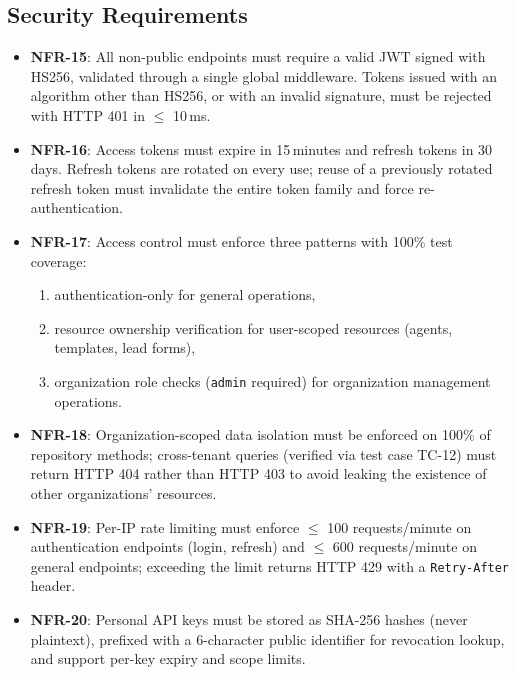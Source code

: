 \documentclass[a4paper]{article}
\begin{document}
\subsection{Security Requirements}
\label{sec:nfr-security}
\begin{itemize}
    \item \textbf{NFR-15}: All non-public endpoints must require
    a valid JWT signed with HS256, validated through a single
    global middleware. Tokens issued with an algorithm other than
    HS256, or with an invalid signature, must be rejected with
    HTTP 401 in $\leq$ 10\,ms.
    \item \textbf{NFR-16}: Access tokens must expire in 15\,minutes
    and refresh tokens in 30\,days. Refresh tokens are rotated on
    every use; reuse of a previously rotated refresh token must
    invalidate the entire token family and force re-authentication.
    \item \textbf{NFR-17}: Access control must enforce three
    patterns with 100\% test coverage:
    \begin{enumerate}
        \item[(a)] authentication-only for general operations,
        \item[(b)] resource ownership verification for user-scoped
        resources (agents, templates, lead forms),
        \item[(c)] organization role checks (\texttt{admin}
        required) for organization management operations.
    \end{enumerate}
    \item \textbf{NFR-18}: Organization-scoped data isolation
    must be enforced on 100\% of repository methods; cross-tenant
    queries (verified via test case TC-12) must return HTTP 404
    rather than HTTP 403 to avoid leaking the existence of other
    organizations' resources.
    \item \textbf{NFR-19}: Per-IP rate limiting must enforce
    $\leq$ 100 requests/minute on authentication endpoints (login,
    refresh) and $\leq$ 600 requests/minute on general endpoints;
    exceeding the limit returns HTTP 429 with a
    \texttt{Retry-After} header.
    \item \textbf{NFR-20}: Personal API keys must be stored as
    SHA-256 hashes (never plaintext), prefixed with a 6-character
    public identifier for revocation lookup, and support
    per-key expiry and scope limits.
\end{itemize}
\end{document}

